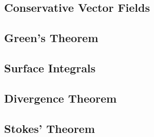 \documentclass[12pt]{article}
\begin{document}
\subsection{Conservative Vector Fields}

\subsection{Green's Theorem}

\subsection{Surface Integrals}

\subsection{Divergence Theorem}

\subsection{Stokes' Theorem}
\end{document}
